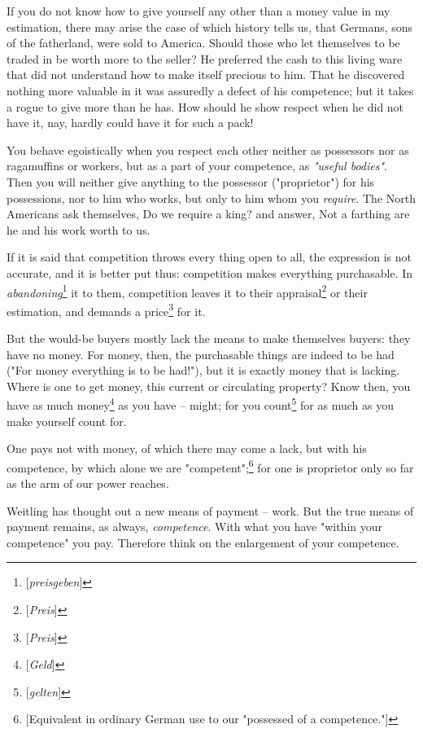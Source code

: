 If you do not know how to give yourself any other than a money value in my 
estimation, there may arise the case of which history tells us, that Germans, 
sons of the fatherland, were sold to America. Should those who let themselves 
to be traded in be worth more to the seller? He preferred the cash to this 
living ware that did not understand how to make itself precious to him. That 
he discovered nothing more valuable in it was assuredly a defect of his 
competence; but it takes a rogue to give more than he has. How should he show 
respect when he did not have it, nay, hardly could have it for such a pack!

You behave egoistically when you respect each other neither as possessors nor 
as ragamuffins or workers, but as a part of your competence, as 
\textit{"{}useful bodies"{}}. Then you will neither give anything to the 
possessor ("{}proprietor"{}) for his possessions, nor to him who works, but 
only to him whom you \textit{require}. The North Americans ask themselves, Do 
we require a king? and answer, Not a farthing are he and his work worth to us.

If it is said that competition throws every thing open to all, the expression 
is not accurate, and it is better put thus: competition makes everything 
purchasable. In \textit{abandoning}\footnote{[\textit{preisgeben}]} it to 
them, competition leaves it to their appraisal\footnote{[\textit{Preis}]} or 
their estimation, and demands a price\footnote{[\textit{Preis}]} for it.

But the would-be buyers mostly lack the means to make themselves buyers: they 
have no money. For money, then, the purchasable things are indeed to be had 
("{}For money everything is to be had!"{}), but it is exactly money that is 
lacking. Where is one to get money, this current or circulating property? Know 
then, you have as much money\footnote{[\textit{Geld}]} as you have -- might; 
for you count\footnote{[\textit{gelten}]} for as much as you make yourself 
count for.

One pays not with money, of which there may come a lack, but with his 
competence, by which alone we are "{}competent"{};\footnote{[Equivalent in 
ordinary German use to our "{}possessed of a competence."{}]} for one is 
proprietor only so far as the arm of our power reaches.

Weitling has thought out a new means of payment -- work. But the true means of 
payment remains, as always, \textit{competence}. With what you have "{}within 
your competence"{} you pay. Therefore think on the enlargement of your 
competence.


